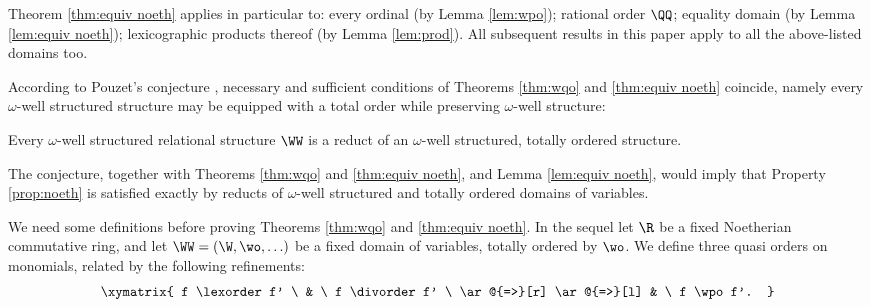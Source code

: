 \begin{remark} \label{rem:appliesto}
\rm
Theorem \ref{thm:equiv noeth}
applies in particular to: every ordinal (by Lemma \ref{lem:wpo}); rational order $\QQ$;
equality domain %
(by Lemma \ref{lem:equiv noeth});
lexicographic products thereof (by Lemma \ref{lem:prod}).
All subsequent results in this paper apply to all the above-listed domains too. 
\end{remark}

According to Pouzet's conjecture \cite{Pouzet20},  
necessary and sufficient conditions of Theorems \ref{thm:wqo} and \ref{thm:equiv noeth}
coincide, namely
 every $\omega$-well structured structure may be equipped with a total order
while preserving $\omega$-well structure:
%
\begin{conjecture}
Every $\omega$-well structured relational structure $\WW$ is
a reduct of an $\omega$-well structured, totally ordered structure.
\end{conjecture}
%
The conjecture, together with Theorems \ref{thm:wqo} and \ref{thm:equiv noeth}, and 
Lemma \ref{lem:equiv noeth},
would imply that 
Property \ref{prop:noeth} is satisfied
exactly by 
reducts of $\omega$-well structured and totally ordered domains of variables.




We need some definitions before proving Theorems \ref{thm:wqo} and \ref{thm:equiv noeth}.
%
In the sequel let $\R$ be a fixed Noetherian commutative ring, and let 
$\WW = (\W, \wo, \ldots)$ be a fixed %
domain of variables, 
totally ordered by  $\wo$.
%
%
We define three quasi orders on monomials, related by the following refinements:
\[
\xymatrix{
f \lexorder f' \ & \ f  \divorder f' \ \ar@{=>}[r] \ar@{=>}[l] & \ f \wpo f'.
}
\]

